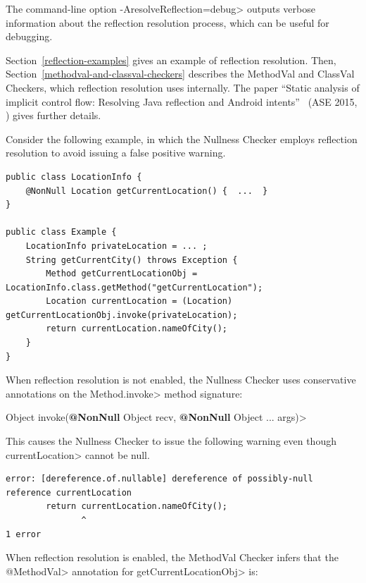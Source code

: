 The command-line option \<-AresolveReflection=debug> outputs verbose
information about the reflection resolution process, which can be useful
for debugging.

Section~\ref{reflection-examples} gives an example of reflection resolution.
Then,
Section~\ref{methodval-and-classval-checkers} describes the MethodVal
and ClassVal Checkers, which reflection resolution uses internally.
The paper ``Static analysis of implicit control flow: Resolving Java reflection and
Android intents''~\cite{BarrosJMVDdAE2015} (ASE 2015,
)
gives further details.



Consider the following example, in which the Nullness Checker employs
reflection resolution to avoid issuing a false positive warning.

\begin{Verbatim}
public class LocationInfo {
    @NonNull Location getCurrentLocation() {  ...  }
}

public class Example {
    LocationInfo privateLocation = ... ;
    String getCurrentCity() throws Exception {
        Method getCurrentLocationObj = LocationInfo.class.getMethod("getCurrentLocation");
        Location currentLocation = (Location) getCurrentLocationObj.invoke(privateLocation);
        return currentLocation.nameOfCity();
    }
}
\end{Verbatim}

When reflection resolution is not enabled, the Nullness Checker uses conservative
annotations on the \<Method.invoke> method signature:

\quad {} Object invoke({\bfseries @NonNull} Object recv, {\bfseries @NonNull} Object ... args)>


This causes the Nullness Checker to issue the following warning even though
\<currentLocation> cannot be null.

\begin{Verbatim}
error: [dereference.of.nullable] dereference of possibly-null reference currentLocation
        return currentLocation.nameOfCity();
               ^
1 error
\end{Verbatim}

\begin{sloppypar}
When reflection resolution is enabled, the MethodVal Checker infers that the \<@MethodVal> annotation for \<getCurrentLocationObj> is:
\end{sloppypar}

